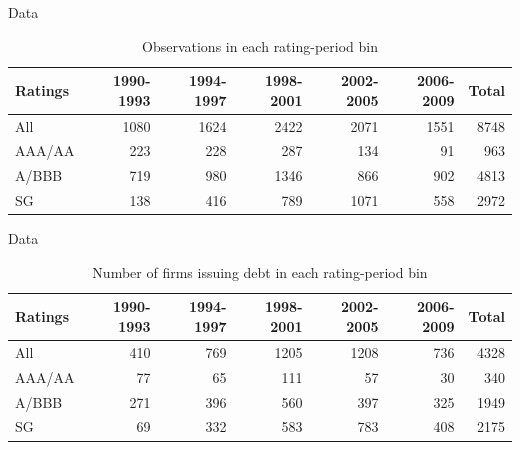 \documentclass{beamer}
\begin{document}
\begin{frame}{Data}
\begin{table}\centering
\begin{tabular}{l *{6}r}
\toprule
Ratings & 1990-1993 & 1994-1997 & 1998-2001 & 2002-2005 & 2006-2009 & Total\\ \midrule
All & 1080 & 1624 & 2422 & 2071 & 1551 & 8748\\
AAA/AA & 223 & 228 & 287 & 134 & 91 & 963\\ 
A/BBB & 719 & 980 & 1346 & 866 & 902 & 4813\\ 
SG & 138 & 416 & 789 & 1071 & 558 & 2972\\ 
\bottomrule
\end{tabular}
\caption{Observations in each rating-period bin}
\end{table}
\end{frame}

\begin{frame}{Data}
\begin{table}\centering
\begin{tabular}{l *{6}r}
\toprule
Ratings & 1990-1993 & 1994-1997 & 1998-2001 & 2002-2005 & 2006-2009 & Total\\ \midrule
All & 410 & 769 & 1205 & 1208 & 736 & 4328\\
AAA/AA & 77 & 65 & 111 & 57 & 30 & 340\\
A/BBB & 271 & 396 & 560 & 397 & 325 & 1949\\
SG & 69 & 332 & 583 & 783 & 408 & 2175\\
\bottomrule
\end{tabular}
\caption{Number of firms issuing debt in each rating-period bin}
\end{table}
\end{frame}
\end{document}
